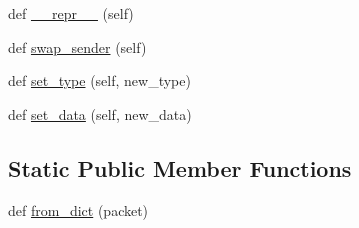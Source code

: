 \begin{DoxyCompactItemize}
\item 
def \hyperlink{classparlai_1_1mturk_1_1core_1_1socket__manager_1_1Packet_a140e38046a95501d5a7798f04b1553bb}{\+\_\+\+\_\+repr\+\_\+\+\_\+} (self)
\item 
def \hyperlink{classparlai_1_1mturk_1_1core_1_1socket__manager_1_1Packet_a369524e6a2a2628fe23d5277fb90a600}{swap\+\_\+sender} (self)
\item 
def \hyperlink{classparlai_1_1mturk_1_1core_1_1socket__manager_1_1Packet_a1269876ae5939e52c10fe4526d50cde4}{set\+\_\+type} (self, new\+\_\+type)
\item 
def \hyperlink{classparlai_1_1mturk_1_1core_1_1socket__manager_1_1Packet_a739506a92dd4482116b64e2e2d4671f2}{set\+\_\+data} (self, new\+\_\+data)
\end{DoxyCompactItemize}
\subsection*{Static Public Member Functions}
\begin{DoxyCompactItemize}
\item 
def \hyperlink{classparlai_1_1mturk_1_1core_1_1socket__manager_1_1Packet_aa186d3b3ba07b6c2eba5e241cbaf92f8}{from\+\_\+dict} (packet)
\end{DoxyCompactItemize}

